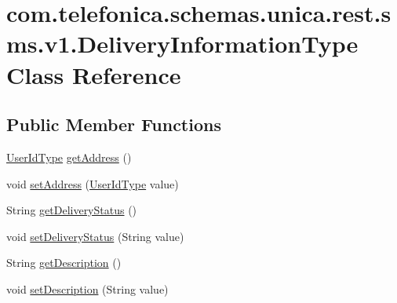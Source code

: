 \hypertarget{classcom_1_1telefonica_1_1schemas_1_1unica_1_1rest_1_1sms_1_1v1_1_1DeliveryInformationType}{
\section{com.telefonica.schemas.unica.rest.sms.v1.DeliveryInformationType Class Reference}
\label{classcom_1_1telefonica_1_1schemas_1_1unica_1_1rest_1_1sms_1_1v1_1_1DeliveryInformationType}
}
\subsection*{Public Member Functions}
\begin{DoxyCompactItemize}
\item 
\hyperlink{classcom_1_1telefonica_1_1schemas_1_1unica_1_1rest_1_1common_1_1v1_1_1UserIdType}{UserIdType} \hyperlink{classcom_1_1telefonica_1_1schemas_1_1unica_1_1rest_1_1sms_1_1v1_1_1DeliveryInformationType_acfed09acf106d2010e77577cd0496023}{getAddress} ()
\item 
void \hyperlink{classcom_1_1telefonica_1_1schemas_1_1unica_1_1rest_1_1sms_1_1v1_1_1DeliveryInformationType_a7d31d4d56e6e72365f3745d0cdafe1e6}{setAddress} (\hyperlink{classcom_1_1telefonica_1_1schemas_1_1unica_1_1rest_1_1common_1_1v1_1_1UserIdType}{UserIdType} value)
\item 
String \hyperlink{classcom_1_1telefonica_1_1schemas_1_1unica_1_1rest_1_1sms_1_1v1_1_1DeliveryInformationType_a02ef15a46a6fb0fe4b0f5bdb59561f05}{getDeliveryStatus} ()
\item 
void \hyperlink{classcom_1_1telefonica_1_1schemas_1_1unica_1_1rest_1_1sms_1_1v1_1_1DeliveryInformationType_a8462980e2165412622082436f3d6d5f5}{setDeliveryStatus} (String value)
\item 
String \hyperlink{classcom_1_1telefonica_1_1schemas_1_1unica_1_1rest_1_1sms_1_1v1_1_1DeliveryInformationType_ac91d89e0cb63aa04b2a6d19fc37e94d1}{getDescription} ()
\item 
void \hyperlink{classcom_1_1telefonica_1_1schemas_1_1unica_1_1rest_1_1sms_1_1v1_1_1DeliveryInformationType_aa0e12609e740b7287ec435e75774b6e7}{setDescription} (String value)
\end{DoxyCompactItemize}
